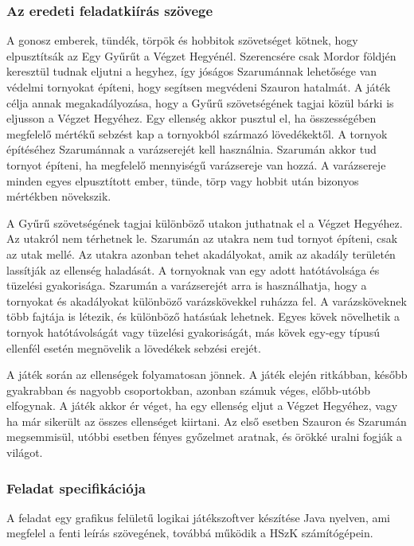 \subsubsection{Az eredeti feladatkiírás szövege} 

A gonosz emberek, tündék, törpök és hobbitok szövetséget kötnek, hogy elpusztítsák az Egy Gyűrűt a Végzet Hegyénél. Szerencsére csak Mordor földjén keresztül tudnak eljutni a hegyhez, így jóságos Szarumánnak lehetősége van védelmi tornyokat építeni, hogy segítsen megvédeni Szauron hatalmát. A játék célja annak megakadályozása, hogy a Gyűrű szövetségének tagjai közül bárki is eljusson a Végzet Hegyéhez. Egy ellenség akkor pusztul el, ha összességében megfelelő mértékű sebzést kap a tornyokból származó lövedékektől. A tornyok építéséhez Szarumánnak a varázserejét kell használnia. Szarumán akkor tud tornyot építeni, ha megfelelő mennyiségű varázsereje van hozzá. A varázsereje minden egyes elpusztított ember, tünde, törp vagy hobbit után bizonyos mértékben növekszik.

A Gyűrű szövetségének tagjai különböző utakon juthatnak el a Végzet Hegyéhez. Az utakról nem térhetnek le. Szarumán az utakra nem tud tornyot építeni, csak az utak mellé. Az utakra azonban tehet akadályokat, amik az akadály területén lassítják az ellenség haladását. A tornyoknak van egy adott hatótávolsága és tüzelési gyakorisága. Szarumán a varázserejét arra is használhatja, hogy a tornyokat és akadályokat különböző varázskövekkel ruházza fel. A varázsköveknek több fajtája is létezik, és különböző hatásúak lehetnek. Egyes kövek növelhetik a tornyok hatótávolságát vagy tüzelési gyakoriságát, más kövek egy-egy típusú ellenfél esetén megnövelik a lövedékek sebzési erejét.

A játék során az ellenségek folyamatosan jönnek. A játék elején ritkábban, később gyakrabban és nagyobb csoportokban, azonban számuk véges, előbb-utóbb elfogynak. A játék akkor ér véget, ha egy ellenség eljut a Végzet Hegyéhez, vagy ha már sikerült az összes ellenséget kiirtani. Az első esetben Szauron és Szarumán megsemmisül, utóbbi esetben fényes győzelmet aratnak, és örökké uralni fogják a világot.

\subsubsection{Feladat specifikációja}

A feladat egy grafikus felületű logikai játékszoftver készítése Java nyelven, ami megfelel a fenti leírás szövegének, továbbá működik a HSzK számítógépein. 

